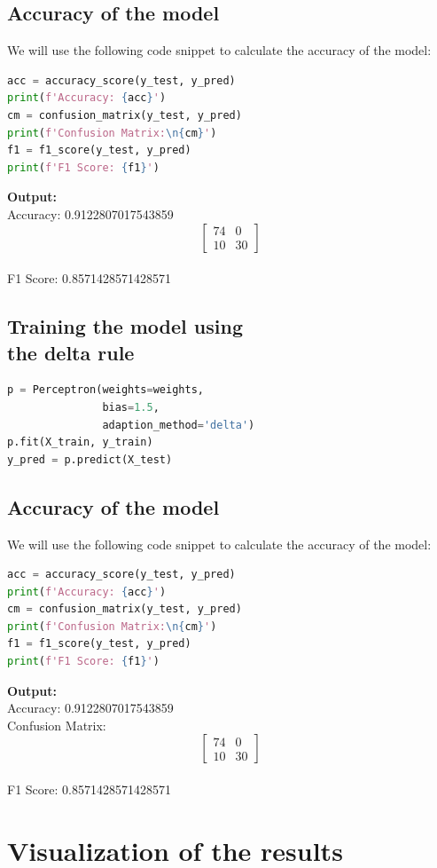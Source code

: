 \subsection{Accuracy of the model}
We will use the following code snippet to calculate the accuracy of the model:
\begin{lstlisting}[language=Python]
acc = accuracy_score(y_test, y_pred)
print(f'Accuracy: {acc}')
cm = confusion_matrix(y_test, y_pred)
print(f'Confusion Matrix:\n{cm}')
f1 = f1_score(y_test, y_pred)
print(f'F1 Score: {f1}')
\end{lstlisting}
\textbf{Output:}\\
Accuracy: 0.9122807017543859\\
$$
\begin{bmatrix}
74 & 0 \\
10 & 30
\end{bmatrix}
$$\\
F1 Score: 0.8571428571428571
\subsection{Training the model using \\the delta rule}
\begin{lstlisting}[language=Python]
p = Perceptron(weights=weights, 
               bias=1.5, 
               adaption_method='delta')
p.fit(X_train, y_train)
y_pred = p.predict(X_test)
\end{lstlisting}
\subsection{Accuracy of the model}
We will use the following code snippet to calculate the accuracy of the model:
\begin{lstlisting}[language=Python]
acc = accuracy_score(y_test, y_pred)
print(f'Accuracy: {acc}')
cm = confusion_matrix(y_test, y_pred)
print(f'Confusion Matrix:\n{cm}')
f1 = f1_score(y_test, y_pred)
print(f'F1 Score: {f1}')
\end{lstlisting}
\textbf{Output:}\\
Accuracy: 0.9122807017543859\\
Confusion Matrix:
$$
\begin{bmatrix}
74 & 0 \\
10 & 30
\end{bmatrix}
$$\\
F1 Score: 0.8571428571428571

\section{Visualization of the results}
